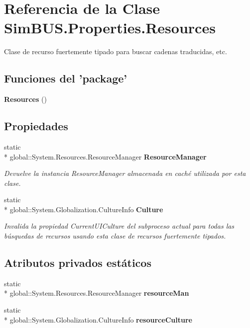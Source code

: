 \section{Referencia de la Clase Sim\-B\-U\-S.\-Properties.\-Resources}
\label{class_sim_b_u_s_1_1_properties_1_1_resources}


Clase de recurso fuertemente tipado para buscar cadenas traducidas, etc.  


\subsection*{Funciones del 'package'}
\begin{DoxyCompactItemize}
\item 
{\bf Resources} ()
\end{DoxyCompactItemize}
\subsection*{Propiedades}
\begin{DoxyCompactItemize}
\item 
static \\*
global\-::\-System.\-Resources.\-Resource\-Manager {\bf Resource\-Manager}\hspace{0.3cm}{\ttfamily  [get]}
\begin{DoxyCompactList}\small\item\em Devuelve la instancia Resource\-Manager almacenada en caché utilizada por esta clase. \end{DoxyCompactList}\item 
static \\*
global\-::\-System.\-Globalization.\-Culture\-Info {\bf Culture}\hspace{0.3cm}{\ttfamily  [get, set]}
\begin{DoxyCompactList}\small\item\em Invalida la propiedad Current\-U\-I\-Culture del subproceso actual para todas las búsquedas de recursos usando esta clase de recursos fuertemente tipados. \end{DoxyCompactList}\end{DoxyCompactItemize}
\subsection*{Atributos privados estáticos}
\begin{DoxyCompactItemize}
\item 
static \\*
global\-::\-System.\-Resources.\-Resource\-Manager {\bf resource\-Man}
\item 
static \\*
global\-::\-System.\-Globalization.\-Culture\-Info {\bf resource\-Culture}
\end{DoxyCompactItemize}



